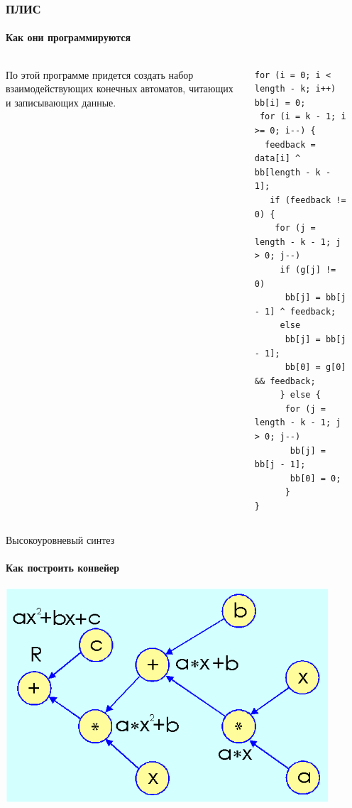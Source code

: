 \documentclass{beamer}              %
\begin{document}
\begin{frame}[fragile]
\frametitle{ПЛИС}
  \framesubtitle{Как они программируются}
  \begin{columns}
      
      По этой программе придется создать набор взаимодействующих конечных автоматов,
         читающих и записывающих данные.

      
      
\begin{lstlisting}[frame=single]
for (i = 0; i < length - k; i++)
bb[i] = 0;
 for (i = k - 1; i >= 0; i--) {
  feedback = data[i] ^ bb[length - k - 1];
   if (feedback != 0) {
    for (j = length - k - 1; j > 0; j--)
	 if (g[j] != 0)
	  bb[j] = bb[j - 1] ^ feedback;
	 else
	  bb[j] = bb[j - 1];
	  bb[0] = g[0] && feedback;
	 } else {
	  for (j = length - k - 1; j > 0; j--)
	   bb[j] = bb[j - 1];
	   bb[0] = 0;
	  }
}
\end{lstlisting}
\label{encode_listing}
      
  \end{columns}
  
\end{frame}

\setwatermark{}

\begin{frame}{Высокоуровневый синтез}
  \framesubtitle{Как построить конвейер}
  \includegraphics[height=8cm]{img/CalcGraphExample.png}
\end{frame}
\end{document}
